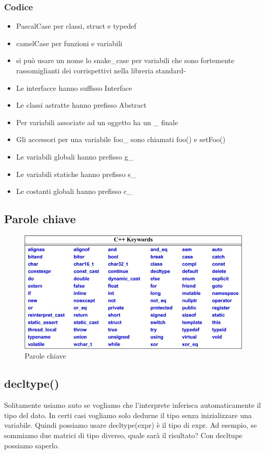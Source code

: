 \documentclass[11pt,a4paper]{book}
\begin{document}
\subsubsection{Codice}
\begin{itemize}
	\item PascalCase per classi, struct e typedef
	\item camelCase per funzioni e variabili
	\item si può usare un nome lo snake\_case per variabili che sono fortemente rassomiglianti dei corrispettivi nella libreria standard-
	\item Le interfacce hanno suffisso Interface
	\item Le classi astratte hanno prefisso Abstract
	\item Per variabili associate ad un oggetto ha un \_ finale
	\item Gli accessori per una variabile foo\_ sono chiamati foo() e setFoo()
	\item Le variabili globali hanno prefisso g\_
	\item Le variabili statiche hanno prefisso s\_
	\item Le costanti globali hanno prefisso c\_
\end{itemize}

\subsection{Parole chiave}
\begin{figure}[h!]
	\begin{center}
		\includegraphics[scale=0.6]{img/014.jpg}
		\caption{Parole chiave}
		\label{fig: 014}
	\end{center}
\end{figure}

\subsection{decltype()}
Solitamente usiamo auto se vogliamo che l'interprete inferisca automaticamente il tipo del dato. In certi casi vogliamo solo dedurne il tipo senza inizializzare una variabile. Quindi possiamo usare decltype(expr) è il tipo di expr. Ad esempio, se sommiamo due matrici di tipo diverso, quale sarà il risultato? Con decltupe possiamo saperlo.
\label{code: 065}
\end{document}
